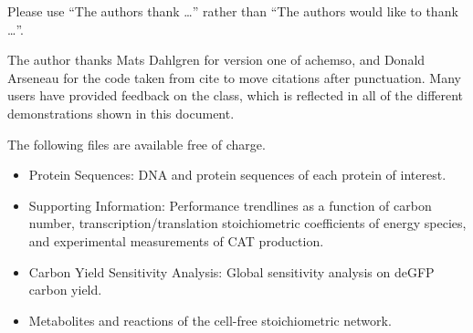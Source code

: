 \documentclass[journal=asbcd6,manuscript=article]{achemso}
\begin{document}
\begin{acknowledgement}

Please use ``The authors thank \ldots'' rather than ``The
authors would like to thank \ldots''.

The author thanks Mats Dahlgren for version one of \textsf{achemso},
and Donald Arseneau for the code taken from \textsf{cite} to move
citations after punctuation. Many users have provided feedback on the
class, which is reflected in all of the different demonstrations
shown in this document.

\end{acknowledgement}

\begin{suppinfo}
The following files are available free of charge.
\begin{itemize}
  \item Protein Sequences: DNA and protein sequences of each protein of interest.
  \item Supporting Information: Performance trendlines as a function of carbon number, transcription/translation stoichiometric coefficients of energy species, and experimental measurements of CAT production.
  \item Carbon Yield Sensitivity Analysis: Global sensitivity analysis on deGFP carbon yield.
  \item Metabolites and reactions of the cell-free stoichiometric network.
\end{itemize}
\end{suppinfo}

\clearpage


\end{document}
